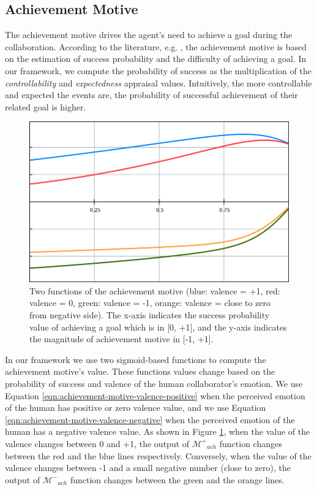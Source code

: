 \documentclass[12pt]{report}
\begin{document}
\subsection{Achievement Motive}
The achievement motive drives the agent's need to achieve a goal during the
collaboration. According to the literature, e.g.
\cite{merrick:acheievement-affiliation-power}, the achievement motive is based
on the estimation of success probability and the difficulty of achieving a goal.
In our framework, we compute the probability of success as the multiplication of
the \textit{controllability} and \textit{expectedness} appraisal values.
Intuitively, the more controllable and expected the events are, the probability
of successful achievement of their related goal is higher.

\begin{figure}[tbh]
  \centering
  \includegraphics[width=1\textwidth]{figure/achievement_motive_functions.png}
  \caption{Two functions of the achievement motive (blue: valence = +1, red:
  valence = 0, green: valence = -1, orange: valence = close to zero from
  negative side). The x-axis indicates the success probability value of
  achieving a goal which is in [0, +1], and the y-axis indicates the magnitude
  of achievement motive in [-1, +1].}
  \label{fig:achievement-motive-functions}
\end{figure}

In our framework we use two sigmoid-based functions to compute the achievement
motive's value. These functions values change based on the probability of
success and valence of the human collaborator's emotion. We use Equation
\ref{eqn:achievement-motive-valence-positive} when the perceived emotion of the
human has positive or zero valence value, and we use Equation
\ref{eqn:achievement-motive-valence-negative} when the perceived emotion
of the human has a negative valence value. As shown in Figure
\ref{fig:achievement-motive-functions}, when the value of the valence changes
between 0 and +1, the output of $\mathcal{M^{+}}_{ach}$ function changes between
the red and the blue lines respectively. Conversely, when the value of the
valence changes between -1 and a small negative number (close to zero), the
output of $\mathcal{M^{-}}_{ach}$ function changes between the green and the
orange lines.
\end{document}
